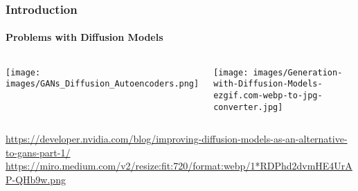 \begin{frame}
    \frametitle{Introduction}
    \framesubtitle{Problems with Diffusion Models}
    
    \begin{columns}
        \centering
        \texttt{[image: images/GANs\_Diffusion\_Autoencoders.png]}
    
        \centering
        \texttt{[image: images/Generation-with-Diffusion-Models-ezgif.com-webp-to-jpg-converter.jpg]}
      \end{columns}  
      \tiny{\footnotemark \url{https://developer.nvidia.com/blog/improving-diffusion-models-as-an-alternative-to-gans-part-1/}}
      \tiny{\footnotemark \url{https://miro.medium.com/v2/resize:fit:720/format:webp/1*RDPhd2dvmHE4UrAP-QHb9w.png}}
    \end{frame}
    
